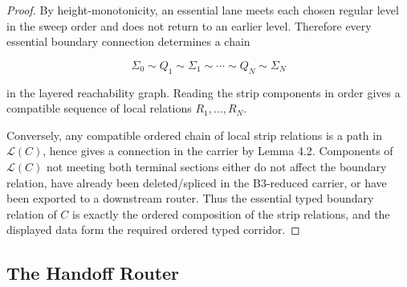 \documentclass[11pt]{amsart}
\theoremstyle{definition}
\begin{document}
\begin{proof}
By height-monotonicity, an essential lane meets each chosen regular level in the sweep order and does not return to an earlier level. Therefore every essential boundary connection determines a chain

\[
\Sigma_0\sim Q_1\sim \Sigma_1\sim\cdots\sim Q_N\sim \Sigma_N
\]

in the layered reachability graph. Reading the strip components in order gives a compatible sequence of local relations \(R_1,\ldots,R_N\).

Conversely, any compatible ordered chain of local strip relations is a path in \(\mathcal L(C)\), hence gives a connection in the carrier by Lemma 4.2. Components of \(\mathcal L(C)\) not meeting both terminal sections either do not affect the boundary relation, have already been deleted/spliced in the B3-reduced carrier, or have been exported to a downstream router. Thus the essential typed boundary relation of \(C\) is exactly the ordered composition of the strip relations, and the displayed data form the required ordered typed corridor.

\end{proof}
\subsection{The Handoff Router}
\end{document}
